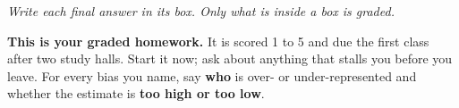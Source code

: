 \documentclass[12pt]{article}
\begin{document}
{\small\itshape Write each final answer in its box. Only what is inside a box is graded.}\par

\vspace{0.04in}

\boxguard[8]
\begin{remindbox}
\small
\textbf{This is your graded homework.} It is scored 1 to 5 and due the first class after two study
halls. Start it now; ask about anything that stalls you before you leave. For every bias you
name, say \textbf{who} is over- or under-represented and whether the estimate is
\textbf{too high or too low}.
\end{remindbox}

\vspace{0.04in}
\end{document}
